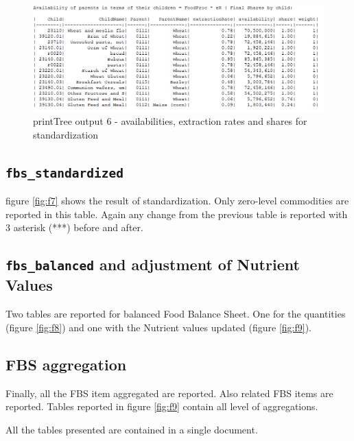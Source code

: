 \documentclass[]{article}
\begin{document}
\begin{figure}[H]

{\centering \includegraphics[width=0.9\linewidth]{images/printTree/06_availability2} 

}

\caption{\label{fig:f6}printTree output 6 - availabilities, extraction rates and shares for standardization}\label{fig:f6}
\end{figure}

\subsection{\texorpdfstring{\texttt{fbs\_standardized}}{fbs\_standardized}}\label{fbs_standardized}

figure \ref{fig:f7} shows the result of standardization. Only zero-level
commodities are reported in this table. Again any change from the
previous table is reported with 3 asterisk (***) before and after.

\subsection{\texorpdfstring{\texttt{fbs\_balanced} and adjustment of
Nutrient
Values}{fbs\_balanced and adjustment of Nutrient Values}}\label{fbs_balanced-and-adjustment-of-nutrient-values}

Two tables are reported for balanced Food Balance Sheet. One for the
quantities (figure \ref{fig:f8}) and one with the Nutrient values
updated (figure \ref{fig:f9}).

\subsection{FBS aggregation}\label{fbs-aggregation}

Finally, all the FBS item aggregated are reported. Also related FBS
items are reported. Tables reported in figure \ref{fig:f9} contain all
level of aggregations.

All the tables presented are contained in a single document.
\end{document}
